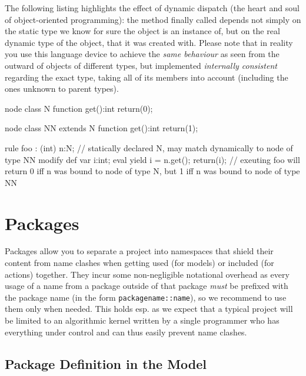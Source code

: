 \begin{example}
The following listing highlights the effect of dynamic dispatch (the heart and soul of object-oriented programming): 
the method finally called depends not simply on the static type we know for sure the object is an instance of,
but on the real dynamic type of the object, that it was created with.
Please note that in reality you use this language device to achieve the \emph{same behaviour} as seen from the outward of objects of different types, but implemented \emph{internally consistent} regarding the exact type, taking all of its members into account (including the ones unknown to parent types).
	\begin{grgen}
node class N
{	
	function get():int
	{
		return(0);
	}
}

node class NN extends N
{	
	function get():int
	{
		return(1);
	}
}

rule foo : (int)
{
	n:N; // statically declared N, may match dynamically to node of type NN
	modify {
		def var i:int;
		eval {
			yield i = n.get();
		}
		return(i); // exeuting foo will return 0 iff n was bound to node of type N, but 1 iff n was bound to node of type NN
	}
}
	\end{grgen}
\end{example}


\section{Packages}\label{sec:packages}

Packages allow you to separate a project into namespaces that shield their content from name clashes when getting used (for models) or included (for actions) together.
They incur some non-negligible notational overhead as every usage of a name from a package outside of that package \emph{must} be prefixed with the package name (in the form \verb#packagename::name#), so we recommend to use them only when needed.
This holds esp. as we expect that a typical project will be limited to an algorithmic kernel written by a single programmer who has everything under control and can thus easily prevent name clashes.

\subsection{Package Definition in the Model}\label{sub:packagemodel} 

